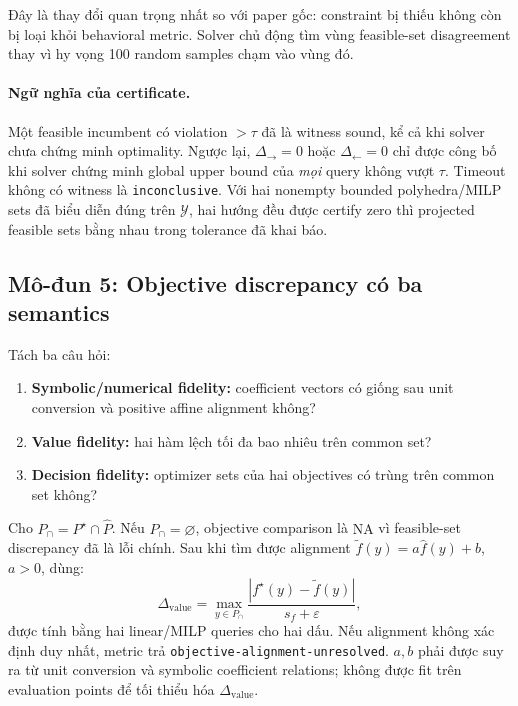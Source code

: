 \documentclass[11pt,a4paper]{article}
\begin{document}
\begin{proposalbox}
Đây là thay đổi quan trọng nhất so với paper gốc: constraint bị thiếu không còn
bị loại khỏi behavioral metric. Solver chủ động tìm vùng feasible-set
disagreement thay vì hy vọng 100 random samples chạm vào vùng đó.
\end{proposalbox}

\paragraph{Ngữ nghĩa của certificate.}
Một feasible incumbent có violation \(>\tau\) đã là witness sound, kể cả khi
solver chưa chứng minh optimality. Ngược lại,
\(\Delta_{\rightarrow}=0\) hoặc \(\Delta_{\leftarrow}=0\) chỉ được công bố khi
solver chứng minh global upper bound của \emph{mọi} query không vượt
\(\tau\). Timeout không có witness là \texttt{inconclusive}. Với hai
nonempty bounded polyhedra/MILP sets đã biểu diễn đúng trên \(\mathcal Y\), hai
hướng đều được certify zero thì projected feasible sets bằng nhau trong
tolerance đã khai báo.

\subsection{Mô-đun 5: Objective discrepancy có ba semantics}

Tách ba câu hỏi:

\begin{enumerate}
  \item \textbf{Symbolic/numerical fidelity:} coefficient vectors có giống sau
  unit conversion và positive affine alignment không?
  \item \textbf{Value fidelity:} hai hàm lệch tối đa bao nhiêu trên common set?
  \item \textbf{Decision fidelity:} optimizer sets của hai objectives có trùng
  trên common set không?
\end{enumerate}

Cho \(P_\cap=P^\star\cap\widehat P\). Nếu \(P_\cap=\varnothing\), objective
comparison là \(\mathrm{NA}\) vì feasible-set discrepancy đã là lỗi chính. Sau
khi tìm được alignment
\(\tilde f(y)=a\widehat f(y)+b\), \(a>0\), dùng:
\[
\Delta_{\mathrm{value}} =
\max_{y\in P_\cap}
\frac{|f^\star(y)-\tilde f(y)|}{s_f+\varepsilon},
\]
được tính bằng hai linear/MILP queries cho hai dấu. Nếu alignment không xác
định duy nhất, metric trả \texttt{objective-alignment-unresolved}. \(a,b\) phải
được suy ra từ unit conversion và symbolic coefficient relations; không được
fit trên evaluation points để tối thiểu hóa \(\Delta_{\mathrm{value}}\).
\end{document}
